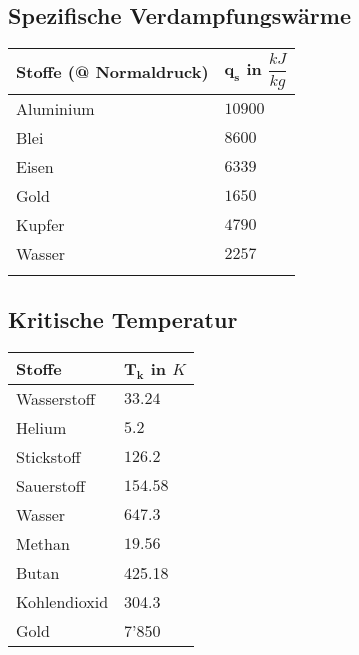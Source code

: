 	\subsection{Spezifische Verdampfungswärme}
		\begin{tabular}{| p{6cm} | p{5cm} |}
			\hline
			\rowcolor{Gray}
			\textbf{Stoffe (@ Normaldruck)}	&	$\boldsymbol{q_s}$ in $\dfrac{kJ}{kg}$\\
			\hline
			Aluminium & $10900$\\
			Blei & $8600$\\
			Eisen & $6339$\\
			Gold & $1650$\\
			Kupfer & $4790$\\
			Wasser & $2257$\\
			& \\
			\hline
		\end{tabular}
	
	\subsection{Kritische Temperatur}
		\begin{tabular}{| p{6cm} | p{5cm} |}
			\hline
			\rowcolor{Gray}
			\textbf{Stoffe}	&	$\boldsymbol{T_k}$ in $K$\\
			\hline
			Wasserstoff & $33.24$\\
			Helium & $5.2$\\
			Stickstoff & $126.2$\\
			Sauerstoff & $154.58$\\
			Wasser & $647.3$\\
			Methan & $19.56$\\
			Butan & 425.18\\
			Kohlendioxid & 304.3\\
			Gold & 7'850\\
			\hline
		\end{tabular}

\vspace{1cm}
